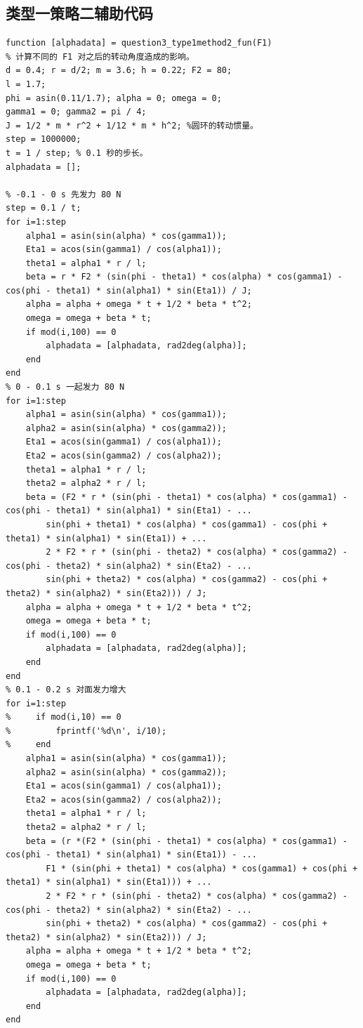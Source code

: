 \documentclass{cumcm}
\begin{document}
\subsection{类型一策略二辅助代码}
\begin{lstlisting}
function [alphadata] = question3_type1method2_fun(F1)
% 计算不同的 F1 对之后的转动角度造成的影响。
d = 0.4; r = d/2; m = 3.6; h = 0.22; F2 = 80;
l = 1.7;
phi = asin(0.11/1.7); alpha = 0; omega = 0;
gamma1 = 0; gamma2 = pi / 4;
J = 1/2 * m * r^2 + 1/12 * m * h^2; %圆环的转动惯量。
step = 1000000;
t = 1 / step; % 0.1 秒的步长。
alphadata = [];

% -0.1 - 0 s 先发力 80 N
step = 0.1 / t;
for i=1:step
    alpha1 = asin(sin(alpha) * cos(gamma1));
    Eta1 = acos(sin(gamma1) / cos(alpha1));
    theta1 = alpha1 * r / l;
    beta = r * F2 * (sin(phi - theta1) * cos(alpha) * cos(gamma1) - cos(phi - theta1) * sin(alpha1) * sin(Eta1)) / J;
    alpha = alpha + omega * t + 1/2 * beta * t^2;
    omega = omega + beta * t;
    if mod(i,100) == 0
        alphadata = [alphadata, rad2deg(alpha)];
    end
end
% 0 - 0.1 s 一起发力 80 N
for i=1:step
    alpha1 = asin(sin(alpha) * cos(gamma1));
    alpha2 = asin(sin(alpha) * cos(gamma2));
    Eta1 = acos(sin(gamma1) / cos(alpha1));
    Eta2 = acos(sin(gamma2) / cos(alpha2));
    theta1 = alpha1 * r / l;
    theta2 = alpha2 * r / l;
    beta = (F2 * r * (sin(phi - theta1) * cos(alpha) * cos(gamma1) - cos(phi - theta1) * sin(alpha1) * sin(Eta1) - ...
        sin(phi + theta1) * cos(alpha) * cos(gamma1) - cos(phi + theta1) * sin(alpha1) * sin(Eta1)) + ...
        2 * F2 * r * (sin(phi - theta2) * cos(alpha) * cos(gamma2) - cos(phi - theta2) * sin(alpha2) * sin(Eta2) - ...
        sin(phi + theta2) * cos(alpha) * cos(gamma2) - cos(phi + theta2) * sin(alpha2) * sin(Eta2))) / J;
    alpha = alpha + omega * t + 1/2 * beta * t^2;
    omega = omega + beta * t;
    if mod(i,100) == 0
        alphadata = [alphadata, rad2deg(alpha)];
    end
end
% 0.1 - 0.2 s 对面发力增大
for i=1:step
%     if mod(i,10) == 0
%         fprintf('%d\n', i/10);
%     end
    alpha1 = asin(sin(alpha) * cos(gamma1));
    alpha2 = asin(sin(alpha) * cos(gamma2));
    Eta1 = acos(sin(gamma1) / cos(alpha1));
    Eta2 = acos(sin(gamma2) / cos(alpha2));
    theta1 = alpha1 * r / l;
    theta2 = alpha2 * r / l;
    beta = (r *(F2 * (sin(phi - theta1) * cos(alpha) * cos(gamma1) - cos(phi - theta1) * sin(alpha1) * sin(Eta1)) - ...
        F1 * (sin(phi + theta1) * cos(alpha) * cos(gamma1) + cos(phi + theta1) * sin(alpha1) * sin(Eta1))) + ...
        2 * F2 * r * (sin(phi - theta2) * cos(alpha) * cos(gamma2) - cos(phi - theta2) * sin(alpha2) * sin(Eta2) - ...
        sin(phi + theta2) * cos(alpha) * cos(gamma2) - cos(phi + theta2) * sin(alpha2) * sin(Eta2))) / J;
    alpha = alpha + omega * t + 1/2 * beta * t^2;
    omega = omega + beta * t;
    if mod(i,100) == 0
        alphadata = [alphadata, rad2deg(alpha)];
    end
end


\end{lstlisting}
\end{document}
